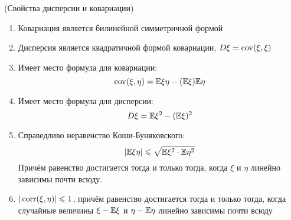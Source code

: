 \begin{lemma} (Свойства дисперсии и ковариации)
	\begin{enumerate}
		\item Ковариация является билинейной симметричной формой
		
		\item Дисперсия является квадратичной формой ковариации, $D\xi = \operatorname{cov}(\xi, \xi)$
		
		\item Имеет место формула для ковариации:
		\[
			\operatorname{cov}(\xi, \eta) = \mathbb{E}\xi\eta - (\mathbb{E}\xi)\mathbb{E}\eta
		\]
		
		\item Имеет место формула для дисперсии:
		\[
			D\xi = \mathbb{E}\xi^2 - (\mathbb{E}\xi)^2
		\]
		
		\item Справедливо неравенство Коши-Буняковского:
		\[
			|\mathbb{E}\xi\eta| \leqslant \sqrt{\mathbb{E}\xi^2 \cdot \mathbb{E}\eta^2}
		\]
		Причём равенство достигается тогда и только тогда, когда $\xi$ и $\eta$ линейно зависимы почти всюду.
		
		\item $|\operatorname{corr}(\xi, \eta)| \leqslant 1$, причём равенство достигается тогда и только тогда, когда случайные величины $\xi - \mathbb{E}\xi$ и $\eta - \mathbb{E}\eta$ линейно зависимы почти всюду
	\end{enumerate}
\end{lemma}

